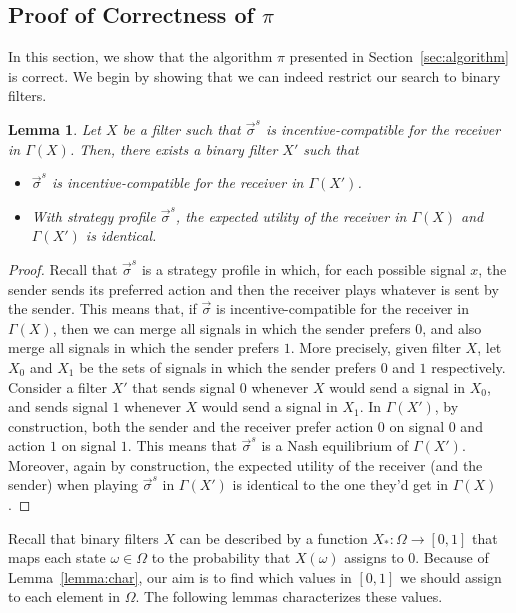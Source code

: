 \documentclass[submission,copyright,creativecommons]{eptcs}
\newtheorem{lemma}{Lemma}
\begin{document}
\subsection{Proof of Correctness of $\pi$}\label{sec:correctness}

In this section, we show that the algorithm $\pi$ presented in Section~\ref{sec:algorithm} is correct. We begin by showing that we can indeed restrict our search to binary filters.

\begin{lemma}\label{lem:simplification}
Let $X$ be a filter such that $\vec{\sigma}^s$ is incentive-compatible for the receiver in $\Gamma(X)$. Then, there exists a binary filter $X'$ such that 
\begin{itemize}
\item[(a)] $\vec{\sigma}^s$ is incentive-compatible for the receiver in $\Gamma(X')$.
\item[(b)] With strategy profile $\vec{\sigma}^s$, the expected utility of the receiver in $\Gamma(X)$ and $\Gamma(X')$ is identical.
\end{itemize}
\end{lemma}
\begin{proof}
Recall that $\vec{\sigma}^s$ is a strategy profile in which, for each possible signal $x$, the sender sends its preferred action and then the receiver plays whatever is sent by the sender. This means that, if $\vec{\sigma}$ is incentive-compatible for the receiver in $\Gamma(X)$, then we can merge all signals in which the sender prefers $0$, and also merge all signals in which the sender prefers $1$. More precisely, given filter $X$, let $X_0$ and $X_1$ be the sets of signals in which the sender prefers $0$ and $1$ respectively. Consider a filter $X'$ that sends signal $0$ whenever $X$ would send a signal in $X_0$, and sends signal $1$ whenever $X$ would send a signal in $X_1$. In $\Gamma(X')$, by construction, both the sender and the receiver prefer action $0$ on signal $0$ and action $1$ on signal $1$. This means that $\vec{\sigma}^s$ is a Nash equilibrium of $\Gamma(X')$. Moreover, again by construction, the expected utility of the receiver (and the sender) when playing $\vec{\sigma}^s$ in $\Gamma(X')$ is identical to the one they'd get in $\Gamma(X)$.
\end{proof}

Recall that binary filters $X$ can be described by a function $X_* : \Omega \longrightarrow [0,1]$ that maps each state $\omega \in \Omega$ to the probability that $X(\omega)$ assigns to $0$. 
Because of Lemma~\ref{lemma:char}, our aim is to find which values in $[0,1]$ we should assign to each element in $\Omega$. The following lemmas characterizes these values.
\end{document}
